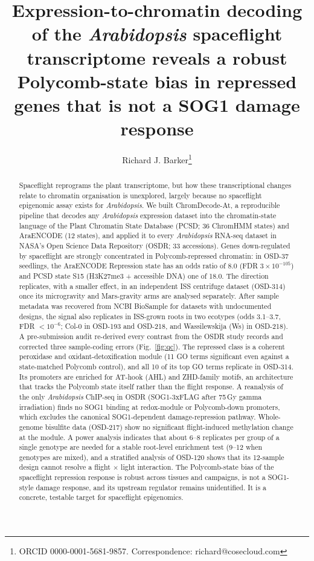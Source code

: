 \documentclass[11pt,a4paper]{article}
\title{\bfseries Expression-to-chromatin decoding of the \textit{Arabidopsis}
spaceflight transcriptome reveals a robust Polycomb-state bias in repressed genes
that is not a SOG1 damage response}
\author[1]{Richard J. Barker\thanks{ORCID 0000-0001-5681-9857. Correspondence: richard@cosecloud.com}}
\affil[1]{Center of Space Exploration (CoSE)}
\date{}
\newcommand{\ChromDecode}{ChromDecode-At}
\begin{document}
\maketitle

\begin{abstract}
\noindent
Spaceflight reprograms the plant transcriptome, but how these transcriptional changes
relate to chromatin organisation is unexplored, largely because no spaceflight
epigenomic assay exists for \textit{Arabidopsis}. We built \ChromDecode{}, a
reproducible pipeline that decodes any \textit{Arabidopsis} expression dataset into
the chromatin-state language of the Plant Chromatin State Database (PCSD; 36 ChromHMM
states) and AraENCODE (12 states), and applied it to every \textit{Arabidopsis} RNA-seq
dataset in NASA's Open Science Data Repository (OSDR; 33 accessions). Genes
down-regulated by spaceflight are strongly concentrated in Polycomb-repressed
chromatin: in OSD-37 seedlings, the AraENCODE Repression state has an odds ratio of
8.0 (FDR $3\times10^{-105}$) and PCSD state S15 (H3K27me3 + accessible DNA) one of 18.0. The
direction replicates, with a smaller effect, in an independent ISS centrifuge dataset (OSD-314) once its
microgravity and Mars-gravity arms are analysed separately. After sample metadata was recovered from NCBI BioSample
for datasets with undocumented designs, the signal also replicates in ISS-grown roots in two ecotypes (odds
3.1--3.7, FDR $<10^{-6}$; Col-0 in OSD-193 and OSD-218, and Wassilewskija (Ws) in OSD-218). A pre-submission audit
re-derived every contrast from the OSDR study records and corrected three sample-coding errors (Fig.~\ref{fig:qc}). The repressed class is a
coherent peroxidase and oxidant-detoxification module (11 GO terms significant even
against a state-matched Polycomb control), and all 10 of its top GO terms replicate in OSD-314. Its promoters are enriched for AT-hook (AHL)
and ZHD-family motifs, an architecture that tracks the Polycomb state itself rather
than the flight response. A reanalysis of the only \textit{Arabidopsis} ChIP-seq in
OSDR (SOG1-3xFLAG after 75\,Gy gamma irradiation) finds no SOG1 binding at
redox-module or Polycomb-down promoters, which excludes the canonical SOG1-dependent
damage-repression pathway. Whole-genome bisulfite data (OSD-217) show no significant
flight-induced methylation change at the module. A power analysis indicates that
about 6--8 replicates per group of a single genotype are needed for a stable root-level enrichment test
(9--12 when genotypes are mixed),
and a stratified analysis of OSD-120 shows that its 12-sample design cannot resolve a
flight $\times$ light interaction. The Polycomb-state bias of the spaceflight
repression response is robust across tissues and campaigns, is not a SOG1-style
damage response, and its upstream regulator remains unidentified. It is a concrete,
testable target for spaceflight epigenomics.
\end{abstract}
\end{document}
